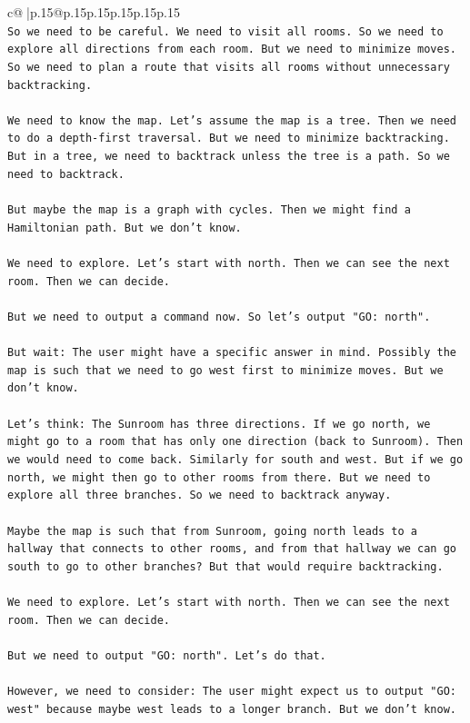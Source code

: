\documentclass{article}
\begin{document}
{\begin{supertabular}{c@{$\;$}|p{.15\linewidth}@{}p{.15\linewidth}p{.15\linewidth}p{.15\linewidth}p{.15\linewidth}p{.15\linewidth}}
{{{\\ 
\texttt{So we need to be careful. We need to visit all rooms. So we need to explore all directions from each room. But we need to minimize moves. So we need to plan a route that visits all rooms without unnecessary backtracking.} \\
\\ 
\texttt{We need to know the map. Let's assume the map is a tree. Then we need to do a depth{-}first traversal. But we need to minimize backtracking. But in a tree, we need to backtrack unless the tree is a path. So we need to backtrack.} \\
\\ 
\texttt{But maybe the map is a graph with cycles. Then we might find a Hamiltonian path. But we don't know.} \\
\\ 
\texttt{We need to explore. Let's start with north. Then we can see the next room. Then we can decide.} \\
\\ 
\texttt{But we need to output a command now. So let's output "GO: north".} \\
\\ 
\texttt{But wait: The user might have a specific answer in mind. Possibly the map is such that we need to go west first to minimize moves. But we don't know.} \\
\\ 
\texttt{Let's think: The Sunroom has three directions. If we go north, we might go to a room that has only one direction (back to Sunroom). Then we would need to come back. Similarly for south and west. But if we go north, we might then go to other rooms from there. But we need to explore all three branches. So we need to backtrack anyway.} \\
\\ 
\texttt{Maybe the map is such that from Sunroom, going north leads to a hallway that connects to other rooms, and from that hallway we can go south to go to other branches? But that would require backtracking.} \\
\\ 
\texttt{We need to explore. Let's start with north. Then we can see the next room. Then we can decide.} \\
\\ 
\texttt{But we need to output "GO: north". Let's do that.} \\
\\ 
\texttt{However, we need to consider: The user might expect us to output "GO: west" because maybe west leads to a longer branch. But we don't know.} \\
}}}
\end{supertabular}}
\end{document}
